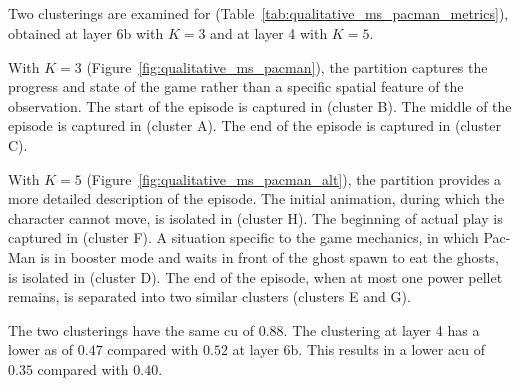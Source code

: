 \newpage
\subsection{\MsPacManName}

Two clusterings are examined for \MsPacManName (Table~\ref{tab:qualitative_ms_pacman_metrics}), obtained at layer 6b with $K=3$ and at layer 4 with $K=5$.

With $K=3$ (Figure~\ref{fig:qualitative_ms_pacman}), the partition captures the progress and state of the game rather than a specific spatial feature of the observation.
The start of the episode is captured in (cluster B).
The middle of the episode is captured in (cluster A).
The end of the episode is captured in (cluster C).

With $K=5$ (Figure~\ref{fig:qualitative_ms_pacman_alt}), the partition provides a more detailed description of the episode.
The initial animation, during which the character cannot move, is isolated in (cluster H).
The beginning of actual play is captured in (cluster F).
A situation specific to the game mechanics, in which Pac-Man is in booster mode and waits in front of the ghost spawn to eat the ghosts, is isolated in (cluster D).
The end of the episode, when at most one power pellet remains, is separated into two similar clusters (clusters E and G).

The two clusterings have the same \gls{cu} of $0.88$.
The clustering at layer 4 has a lower \gls{as} of $0.47$ compared with $0.52$ at layer 6b.
This results in a lower \gls{acu} of $0.35$ compared with $0.40$.

